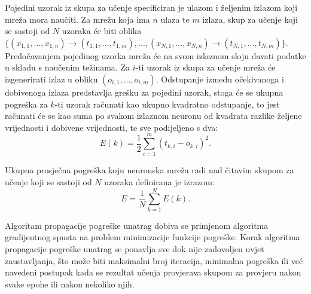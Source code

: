 Pojedini uzorak iz skupa za učenje specificiran je ulazom i željenim izlazom koji mreža mora naučiti. Za mrežu koja ima $n$ ulaza te $m$ izlaza, skup za učenje koji se sastoji od $N$ uzoraka će biti oblika $\{(x_{1,1}, ..., x_{1,n}) \rightarrow (t_{1,1}, ..., t_{1,m}), ..., (x_{N,1}, ..., x_{N,n}) \rightarrow (t_{N,1}, ..., t_{N,m})\}$. Predočavanjem pojedinog uzorka mreža će na svom izlaznom sloju davati podatke u skladu s naučenim težinama. Za $i$-ti uzorak iz skupa za učenje mreža će izgenerirati izlaz u obliku $(o_{i,1}, ..., o_{i,m})$. Odstupanje između očekivanoga i dobivenoga izlaza predstavlja grešku za pojedini uzorak, stoga će se ukupna pogreška za $k$-ti uzorak računati kao ukupno kvadratno odstupanje, to jest računati će se kao suma po svakom izlaznom neuronu od kvadrata razlike željene vrijednosti i dobivene vrijednosti, te sve podijeljeno s dva:
\begin{equation}
    E(k) = \frac{1}{2}\sum_{i=1}^{m} (t_{k,i}-o_{k,i})^2.
\end{equation}

Ukupna prosječna pogreška koju neuronska mreža radi nad čitavim skupom za učenje koji se sastoji od $N$ uzoraka definirana je izrazom:
\begin{equation}
    E = \frac{1}{N}\sum_{k=1}^{N} E(k).
\end{equation}

Algoritam propagacije pogreške unatrag dobiva se primjenom algoritma gradijentnog spusta na problem minimizacije funkcije pogreške. Korak algoritma propagacije pogreške unatrag se ponavlja sve dok nije zadovoljen uvjet zaustavljanja, što može biti maksimalni broj iteracija, minimalna pogreška ili već navedeni postupak kada se rezultat učenja provjerava skupom za provjeru nakon svake epohe ili nakon nekoliko njih.

